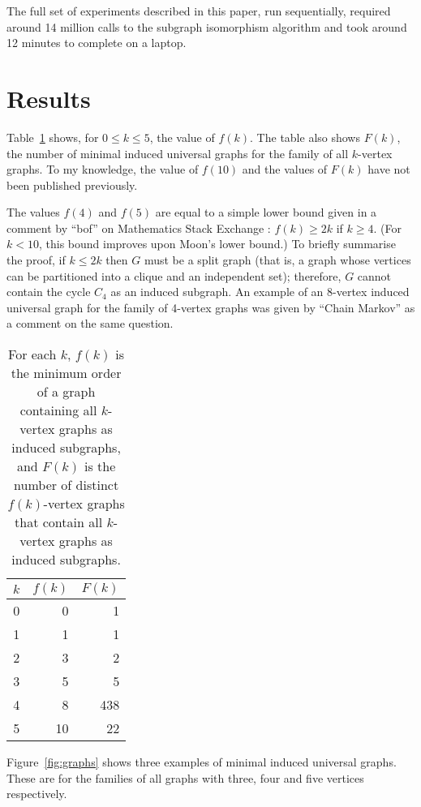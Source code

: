 \documentclass[12pt]{article}
\begin{document}
The full set of experiments described in this paper, run sequentially, required
around 14 million calls to the subgraph isomorphism algorithm and took around
12 minutes to complete on a laptop.

\section{Results}

Table~\ref{tab:graphresults} shows, for $0 \leq k \leq 5$, the value of $f(k)$.
The table also shows $F(k)$, the number of minimal induced universal
graphs for the family of all $k$-vertex graphs.  To my knowledge, the value of
$f(10)$ and the values of $F(k)$ have not been published previously.

The values $f(4)$ and $f(5)$ are equal to a simple lower bound
given in a comment by ``bof'' on Mathematics Stack Exchange
\cite{math_se_question}: $f(k) \geq 2k$ if $k \geq 4$.  (For $k < 10$, this
bound improves upon Moon's lower bound.)  To briefly summarise the proof, if $k \leq 2k$
then $G$ must be a split graph (that is, a graph whose vertices can be
partitioned into a clique and an independent set); therefore, $G$ cannot
contain the cycle $C_4$ as an induced subgraph.  An example of an 8-vertex
induced universal graph for the family of 4-vertex graphs was given by ``Chain
Markov'' as a comment on the same question.

\begin{table}[h!]
\centering
\begin{tabular}{r r r}
 \toprule
 $k$ & $f(k)$ & $F(k)$ \\ [0.5ex]
 \midrule
 0 & 0 & 1 \\
 1 & 1 & 1 \\
 2 & 3 & 2 \\
 3 & 5 & 5 \\
 4 & 8 & 438 \\
 5 & 10 & 22 \\
 \bottomrule
\end{tabular}
\caption{For each $k$, $f(k)$ is the minimum order of a graph containing all $k$-vertex graphs as
induced subgraphs, and $F(k)$ is the number of distinct $f(k)$-vertex graphs that contain
all $k$-vertex graphs as induced subgraphs.}
\label{tab:graphresults}
\end{table}
%
%

Figure~\ref{fig:graphs} shows three examples of minimal induced universal graphs.  
These are for the families of all graphs with three, four and five vertices
respectively.
\end{document}
